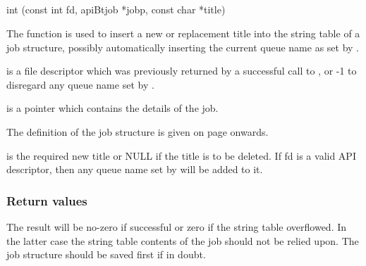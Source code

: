 \subsection{\funcnameXBputtitle{}}

\begin{expara}

int \funcnameXBputtitle{}(const int fd, apiBtjob *jobp, const char *title)

\end{expara}

The function \funcnameXBputtitle{} is used to insert a new or replacement title
into the string table of a job structure, possibly automatically
inserting the current queue name as set by \funcnameXBsetqueue{}.

 is a file descriptor which was previously
returned by a successful call to \funcXBopen{}, or -1
to disregard any queue name set by \funcnameXBsetqueue{}.

 is a pointer which contains the details of
the job.

The definition of the job structure is given on page
\pageref{bkm:Jobstructure} onwards.

 is the required new title or NULL if the
title is to be deleted. If fd is a valid API descriptor, then any queue
name set by \funcXBsetqueue{} will be added to it.

\subsubsection{Return values}
The result will be no-zero if successful or zero if the string table
overflowed. In the latter case the string table contents of the job
should not be relied upon. The job structure should be saved first if
in doubt.

